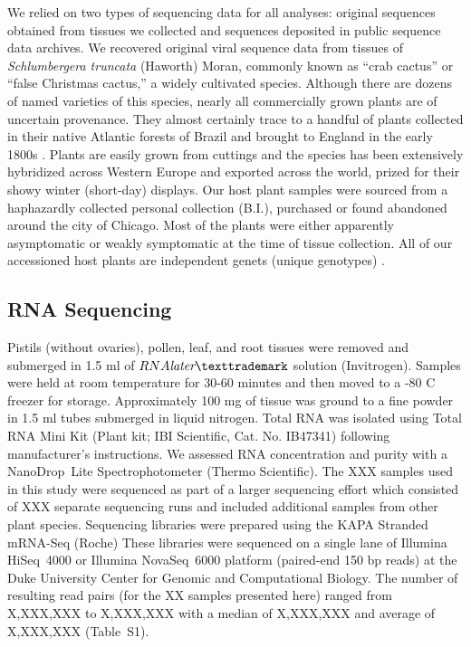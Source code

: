 \documentclass[fleqn,10pt,lineno]{wlpeerj}
\begin{document}
We relied on two types of sequencing data for all analyses: original sequences obtained from tissues we collected and sequences deposited in public sequence data archives. 
We recovered original viral sequence data from tissues of \textit{Schlumbergera truncata} (Haworth) Moran, commonly known as ``crab cactus'' or ``false Christmas cactus,'' a widely cultivated species.
Although there are dozens of named varieties of this species, nearly all commercially grown plants are of uncertain provenance. 
They almost certainly trace to a handful of plants collected in their native Atlantic forests of Brazil and brought to England in the early 1800s \citep{boyle2003}. 
Plants are easily grown from cuttings and the species has been extensively hybridized across Western Europe and exported across the world, prized for their showy winter (short-day) displays.
Our host plant samples were sourced from a haphazardly collected personal collection (B.I.), purchased or found abandoned around the city of Chicago. 
Most of the plants were either apparently asymptomatic or weakly symptomatic at the time of tissue collection.
All of our accessioned host plants are independent genets (unique genotypes) \citep{ramanauskas2021}.

\subsection*{RNA Sequencing}

Pistils (without ovaries), pollen, leaf, and root tissues were removed and submerged in 1.5 ml of $RNA\textit{later}{\texttrademark}$ solution (Invitrogen).
Samples were held at room temperature for 30-60 minutes and then moved to a -80 C freezer for storage.
Approximately 100 mg of tissue was ground to a fine powder in 1.5 ml tubes submerged in liquid nitrogen.
Total RNA was isolated using Total RNA Mini Kit (Plant kit; IBI Scientific, Cat. No. IB47341) following manufacturer's instructions.
We assessed RNA concentration and purity with a NanoDrop\texttrademark~Lite Spectrophotometer (Thermo Scientific).
The XXX samples used in this study were sequenced as part of a larger sequencing effort which consisted of XXX separate sequencing runs and included additional samples from other plant species.
Sequencing libraries were prepared using the KAPA Stranded mRNA-Seq (Roche)
These libraries were sequenced on a single lane of Illumina \mbox{HiSeq}~4000 or Illumina \mbox{NovaSeq}~6000 platform (paired-end 150 bp reads) at the Duke University Center for Genomic and Computational Biology.
The number of resulting read pairs (for the XX samples presented here) ranged from X,XXX,XXX to X,XXX,XXX with a median of X,XXX,XXX and average of X,XXX,XXX (Table~S1).
\end{document}
